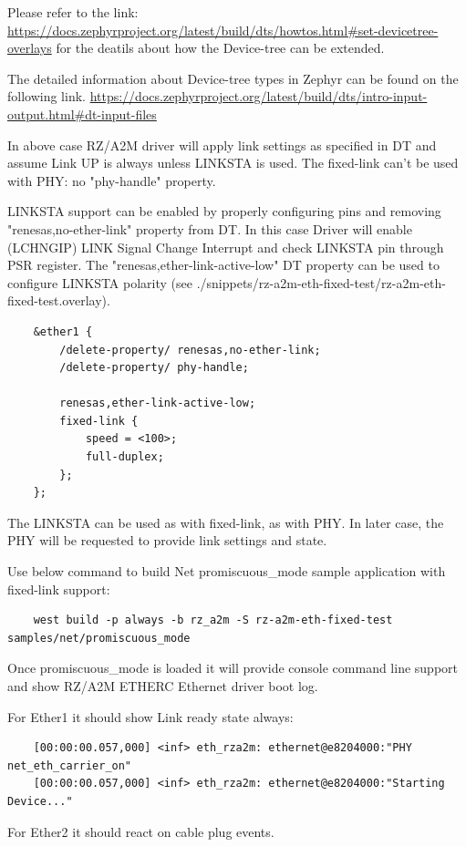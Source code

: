 \documentclass[11pt,a4paper,oneside]{article}
\begin{document}
Please refer to the link:
\url{https://docs.zephyrproject.org/latest/build/dts/howtos.html#set-devicetree-overlays}
for the deatils about how the Device-tree can be extended.

The detailed information about Device-tree types in Zephyr can be found on the following link.
\url{https://docs.zephyrproject.org/latest/build/dts/intro-input-output.html#dt-input-files}

In above case RZ/A2M driver will apply link settings as specified in DT and assume Link UP is always unless LINKSTA is used.
The fixed-link can't be used with PHY: no "phy-handle" property.

LINKSTA support can be enabled by properly configuring pins and removing "renesas,no-ether-link" property from DT.
In this case Driver will enable (LCHNGIP) LINK Signal Change Interrupt and check LINKSTA pin through PSR register.
The "renesas,ether-link-active-low" DT property can be used to configure LINKSTA polarity (see ./snippets/rz-a2m-eth-fixed-test/rz-a2m-eth-fixed-test.overlay).

\begin{lstlisting}
	&ether1 {
		/delete-property/ renesas,no-ether-link;
		/delete-property/ phy-handle;

		renesas,ether-link-active-low;
		fixed-link {
			speed = <100>;
			full-duplex;
		};
	};
\end{lstlisting}

The LINKSTA can be used as with fixed-link, as with PHY. In later case, the PHY will be requested to provide link settings and state.

Use below command to build Net promiscuous\_mode sample application with fixed-link support:

\begin{lstlisting}
	west build -p always -b rz_a2m -S rz-a2m-eth-fixed-test samples/net/promiscuous_mode
\end{lstlisting}

Once promiscuous\_mode is loaded it will provide console command line support and show  RZ/A2M ETHERC Ethernet driver boot log.

For Ether1 it should show Link ready state always:
\begin{lstlisting}
	[00:00:00.057,000] <inf> eth_rza2m: ethernet@e8204000:"PHY net_eth_carrier_on"
	[00:00:00.057,000] <inf> eth_rza2m: ethernet@e8204000:"Starting Device..."
\end{lstlisting}

For Ether2 it should react on cable plug events.
\end{document}
